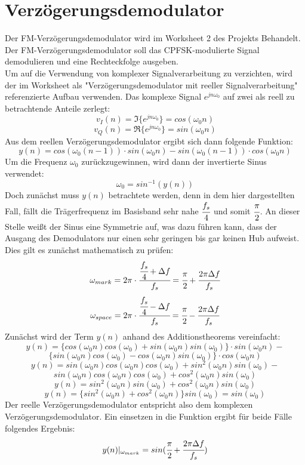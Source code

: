 \documentclass{article}
\begin{document}
\section{Verzögerungsdemodulator} \label{sec:fm-demod}
Der FM-Verzögerungsdemodulator wird im Worksheet 2 des Projekts Behandelt.
Der FM-Verzögerungsdemodulator soll das \ac{CPFSK}-modulierte Signal demodulieren und eine Rechteckfolge ausgeben.\\
Um auf die Verwendung von komplexer Signalverarbeitung zu verzichten, wird der im Worksheet als "Verzögerungsdemodulator mit 
reeller Signalverarbeitung" referenzierte Aufbau verwenden. Das komplexe Signal $e^{jn\omega_0}$ 
auf zwei als reell zu betrachtende Anteile zerlegt:
$$
v_I(n) = \Im\{e^{jn\omega_0}\} = cos(\omega_0 n)
$$
$$
v_Q(n) = \Re{\{e^{jn\omega_0}\}} = sin(\omega_0 n)
$$
Aus dem reellen Verzögerungsdemodulator ergibt sich dann folgende Funktion:
$$
y(n) = cos(\omega_0 (n-1)) \cdot sin(\omega_0 n) - sin(\omega_0 (n-1)) \cdot cos(\omega_0 n) 
$$
Um die Frequenz $\omega_0$ zurückzugewinnen, wird dann der invertierte Sinus verwendet:
$$
\omega_0 = sin^{-1}(y(n))
$$ 
Doch zunächst muss $y(n)$ betrachtete werden, denn in dem hier dargestellten Fall, fällt die Trägerfrequenz im Basisband sehr nahe $\cfrac{f_s}{4}$ und somit $\cfrac{\pi}{2}$. An dieser Stelle weißt der Sinus eine Symmetrie auf, was dazu führen kann, dass der Ausgang des Demodulators nur einen sehr geringen bis gar keinen Hub aufweist. Dies gilt es zunächst mathematisch zu prüfen:
$$
\omega_{mark} = 2 \pi\cdot \cfrac{\cfrac{f_s}{4}+\Delta f}{f_s}=\cfrac{\pi}{2}+\cfrac{2 \pi \Delta f}{f_s}
$$
$$
\omega_{space} = 2 \pi\cdot \cfrac{\cfrac{f_s}{4}-\Delta f}{f_s}=\cfrac{\pi}{2}-\cfrac{2 \pi \Delta f}{f_s}
$$
Zunächst wird der Term $y(n)$ anhand des Additionstheorems vereinfacht:
$$
y(n) = \{cos(\omega_0 n)cos(\omega_0) + sin(\omega_0 n)sin(\omega_0)\} \cdot sin(\omega_0 n) - 
$$
$$
\{sin(\omega_0 n)cos(\omega_0) - cos(\omega_0 n)sin(\omega_0) \} \cdot cos(\omega_0 n) 
$$ 
$$
y(n) = sin(\omega_0 n)cos(\omega_0 n)cos(\omega_0) + sin^2(\omega_0 n)sin(\omega_0) - 
$$
$$
sin(\omega_0 n)cos(\omega_0 n)cos(\omega_0) + cos^2(\omega_0 n)sin(\omega_0) 
$$ 
$$
y(n) = sin^2(\omega_0 n)sin(\omega_0) + cos^2(\omega_0 n)sin(\omega_0) 
$$
$$
y(n) = \{sin^2(\omega_0 n) + cos^2(\omega_0 n)\}sin(\omega_0) = sin(\omega_0)
$$
Der reelle Verzögerungsdemodulator entspricht also dem komplexen Verzögerungsdemodulator. Ein einsetzen in die Funktion ergibt für beide Fälle folgendes Ergebnis:
$$
y(n)\arrowvert_{\omega_{mark}} = sin(\cfrac{\pi}{2}+\cfrac{2 \pi \Delta f}{f_s})
$$
\end{document}
